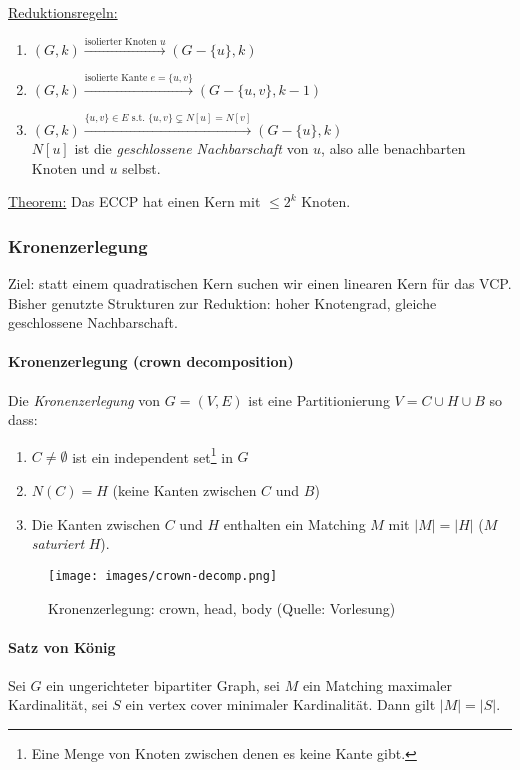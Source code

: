 \underline{Reduktionsregeln:}
\begin{enumerate}[label=(\roman*)]
    \item $(G, k) \xrightarrow{\text{isolierter Knoten } u} (G-\{ u \}, k)$
    \item $(G, k) \xrightarrow{\text{isolierte Kante } e=\{u,v\} } (G-\{ u,v \}, k-1)$
    \item $(G, k) \xrightarrow{\{u,v\} \in E \text{ s.t. } \{u,v\} \subsetneq N[u] = N[v] } (G-\{ u \}, k)$ \\
    $N[u]$ ist die \emph{geschlossene Nachbarschaft} von $u$, also alle benachbarten Knoten und $u$ selbst.
\end{enumerate}

\underline{Theorem:} Das ECCP hat einen Kern mit $\leq 2^k$ Knoten.


\subsubsection{Kronenzerlegung}

Ziel: statt einem quadratischen Kern suchen wir einen linearen Kern für das VCP. \\
Bisher genutzte Strukturen zur Reduktion: hoher Knotengrad, gleiche geschlossene Nachbarschaft.

\paragraph{Kronenzerlegung (crown decomposition)}
Die \emph{Kronenzerlegung} von $G=(V,E)$ ist eine Partitionierung $V = C \cup H \cup B$ so dass:
\begin{enumerate}[label=(\roman*)]
    \item $C \neq \emptyset$ ist ein independent set\footnote{Eine Menge von Knoten zwischen denen es keine Kante gibt.} in $G$
    \item $N(C) = H$ (keine Kanten zwischen $C$ und $B$)
    \item Die Kanten zwischen $C$ und $H$ enthalten ein Matching $M$ mit $|M| = |H|$ ($M$ \emph{saturiert} $H$).
\end{enumerate}

\begin{figure}[h]
    \centering
    \texttt{[image: images/crown-decomp.png]}
    \caption{Kronenzerlegung: crown, head, body (Quelle: Vorlesung)}
    \label{fig:crown-decomp}
\end{figure}

\paragraph{Satz von König}
Sei $G$ ein ungerichteter bipartiter Graph, sei $M$ ein Matching maximaler Kardinalität,
sei $S$ ein vertex cover minimaler Kardinalität.
Dann gilt $|M| = |S|$.


